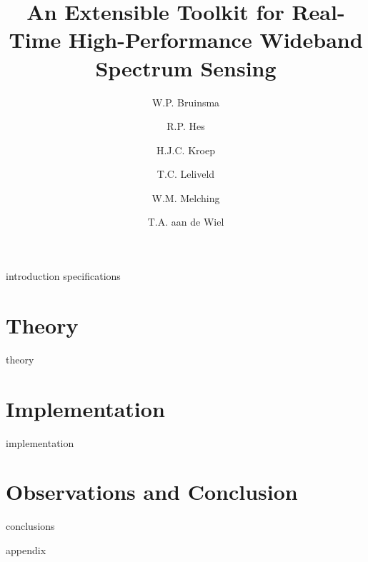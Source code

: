 \documentclass[a4paper, openany, oneside]{memoir}
\title{An Extensible Toolkit for Real-Time High-Performance Wideband Spectrum Sensing}
\author{W.P. Bruinsma \and R.P. Hes \and H.J.C. Kroep \and T.C. Leliveld \and W.M. Melching \and T.A. aan de Wiel}
\begin{document}
\frontmatter

\begin{titlingpage}
  \pagestyle{empty}
  \maketitle
\end{titlingpage}


\tableofcontents

\mainmatter
{introduction}
{specifications}


\part{Theory}
\label{prt:theory}
{theory}
\part{Implementation}
\label{prt:implementation}
{implementation}


\part{Observations and Conclusion}
{conclusions}

{}
\printbibliography

{appendix}
\end{document}
